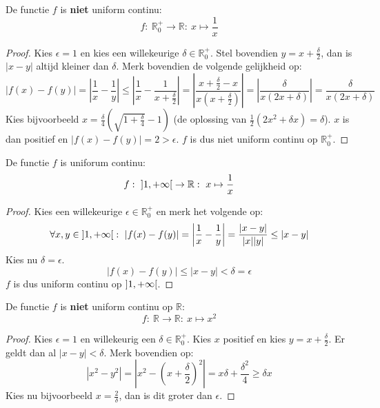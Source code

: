 \documentclass[main.tex]{subfiles}
\begin{document}
\begin{tvb}
  De functie $f$ is \textbf{niet} uniform continu:
  \[ f:\ \mathbb{R}_{0}^{+} \rightarrow \mathbb{R}:\ x \mapsto \frac{1}{x} \]

  \begin{proof}
    Kies $\epsilon = 1$ en kies een willekeurige $\delta \in \mathbb{R}_{0}^{+}$.
    Stel bovendien $y = x + \frac{\delta}{2}$, dan is $|x-y|$ altijd kleiner dan $\delta$.
    Merk bovendien de volgende gelijkheid op:
    \[ |f(x)-f(y)| = \left| \frac{1}{x} - \frac{1}{y} \right| \le \left| \frac{1}{x} - \frac{1}{x + \frac{\delta}{2}} \right| = \left| \frac{x+\frac{\delta}{2}-x}{x(x+\frac{\delta}{2})}\right| = \left| \frac{\delta}{x(2x+\delta)} \right| = \frac{\delta}{x(2x+\delta)} \]
    Kies bijvoorbeeld $x = \frac{\delta}{4}\left(\sqrt{1+\frac{\delta}{4}}-1\right)$ (de oplossing van $\frac{1}{2}(2x^{2}+\delta x) = \delta$).
    $x$ is dan positief en $|f(x)-f(y)| = 2 > \epsilon$.
    $f$ is dus niet uniform continu op $\mathbb{R}_{0}^{+}$.
  \end{proof}
\end{tvb}

\begin{vb}
  De functie $f$ is uniforum continu:
  \[ f:\ \interval[open]{1}{+\infty} \rightarrow \mathbb{R}:\ x \mapsto \frac{1}{x} \]
    \begin{figure}[H]
      \centering
    \end{figure}

    \begin{proof}
      Kies een willekeurige $\epsilon \in \mathbb{R}_{0}^{+}$ en merk het volgende op:
      \[ \forall x,y \in \interval[open]{1}{+\infty}:\ |f(x)-f(y)| = \left|\frac{1}{x}- \frac{1}{y}\right| = \frac{|x-y|}{|x||y|} \le |x-y| \]
      Kies nu $\delta = \epsilon$.
      \[ |f(x)-f(y)| \le |x-y| < \delta = \epsilon \]
      $f$ is dus uniform continu op $\interval[open]{1}{+\infty}$.
    \end{proof}
\end{vb}


\begin{tvb}
  De functie $f$ is \textbf{niet} uniform continu op $\mathbb{R}$:
  \[ f:\ \mathbb{R} \rightarrow \mathbb{R}:\ x \mapsto x^{2}\]

  \begin{proof}
    Kies $\epsilon = 1$ en willekeurig een $\delta \in \mathbb{R}_{0}^{+}$.
    Kies $x$ positief en kies $y= x+\frac{\delta}{2}$.
    Er geldt dan al $|x-y|<\delta$.
    Merk bovendien op:
    \[ |x^{2}-y^{2}| = |x^{2}-\left(x+\frac{\delta}{2}\right)^{2}| = x\delta + \frac{\delta^{2}}{4} \ge \delta x \]
    Kies nu bijvoorbeeld $x=\frac{2}{\delta}$, dan is dit groter dan $\epsilon$.
  \end{proof}
\end{tvb}
\end{document}

